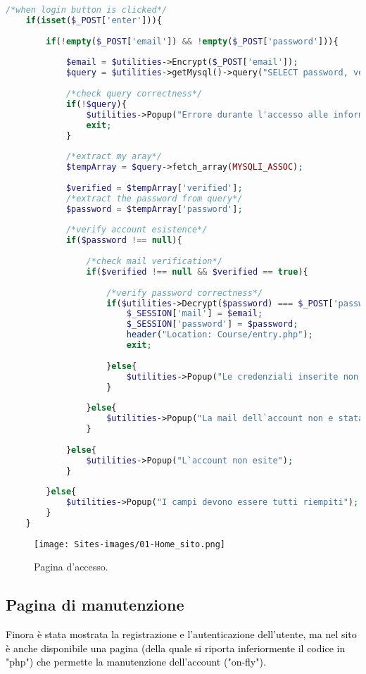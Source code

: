 \begin{lstlisting}[language=php]
	/*when login button is clicked*/
	if(isset($_POST['enter'])){
		
		if(!empty($_POST['email']) && !empty($_POST['password'])){
			
			$email = $utilities->Encrypt($_POST['email']);
			$query = $utilities->getMysql()->query("SELECT password, verified FROM user_table1 WHERE (email = '{$email}')");
			
			/*check query correctness*/
			if(!$query){
				$utilities->Popup("Errore durante l'accesso alle informazioni");
				exit;
			}
			
			/*extract my aray*/
			$tempArray = $query->fetch_array(MYSQLI_ASSOC);
			
			$verified = $tempArray['verified'];
			/*extract the password from query*/
			$password = $tempArray['password'];
			
			/*verify account esistence*/  
			if($password !== null){
				
				/*check mail verification*/
				if($verified !== null && $verified == true){
					
					/*verify password correctness*/
					if($utilities->Decrypt($password) === $_POST['password']){
						$_SESSION['mail'] = $email;
						$_SESSION['password'] = $password;
						header("Location: Course/entry.php");
						exit;
						
					}else{
						$utilities->Popup("Le credenziali inserite non sono corrette");
					}
					
				}else{
					$utilities->Popup("La mail dell`account non e stata verificata.");
				}
				
			}else{
				$utilities->Popup("L`account non esite");
			}
			
		}else{
			$utilities->Popup("I campi devono essere tutti riempiti");
		}
	}
\end{lstlisting}

\begin{figure}[h]
	\begin{center}
		\texttt{[image: Sites-images/01-Home\_sito.png]}
		\caption{Pagina d'accesso.}
	\end{center}
\end{figure}

\subsection{Pagina di manutenzione}
\textcolor{black}{Finora è stata mostrata la registrazione e l'autenticazione dell'utente, ma nel sito è anche disponibile una pagina (della quale si riporta inferiormente il codice in "php") che permette la manutenzione dell'account ("on-fly").}\\

